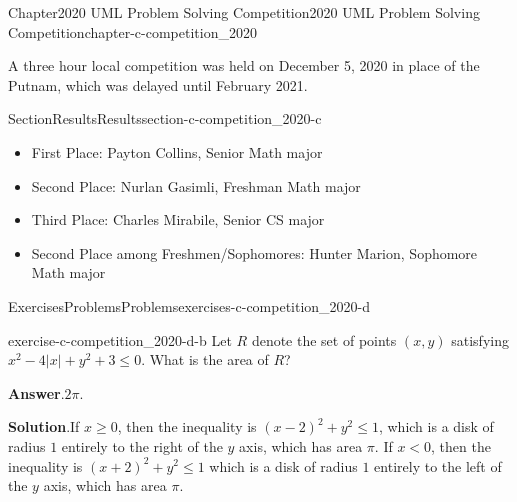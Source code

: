 \documentclass[oneside,10pt,]{book}
\newcommand{\blocktitlefont}{\relax}
\numberwithin{equation}{section}
\newcommand{\lt}{<}
\begin{document}
%
%
\typeout{************************************************}
\typeout{************************************************}
%
\begin{chapterptx}{Chapter}{2020 UML Problem Solving Competition}{}{2020 UML Problem Solving Competition}{}{}{chapter-c-competition_2020}
\renewcommand*{\chaptername}{Chapter}
\begin{introduction}{}%
A three hour local competition was held on December 5, 2020 in place of the Putnam, which was delayed until February 2021.%
\end{introduction}%
%
%
\typeout{************************************************}
\typeout{************************************************}
%
\begin{sectionptx}{Section}{Results}{}{Results}{}{}{section-c-competition_2020-c}
%
\begin{itemize}[label=\textbullet]
\item{}First Place:  Payton Collins, Senior Math major%
\item{}Second Place: Nurlan Gasimli, Freshman Math major%
\item{}Third Place: Charles Mirabile, Senior CS major%
\item{}Second Place among Freshmen\slash{}Sophomores:  Hunter Marion, Sophomore Math major%
\end{itemize}
%
\end{sectionptx}
%
%
\typeout{************************************************}
\typeout{************************************************}
%
\begin{exercises-section}{Exercises}{Problems}{}{Problems}{}{}{exercises-c-competition_2020-d}
\begin{divisionexercise}{1}{}{}{exercise-c-competition_2020-d-b}%
Let \(R\) denote the set of points \((x, y)\) satisfying \(x^2 - 4 \lvert x \rvert +y^2 + 3 \leq 0\). What is the area of \(R\)?%
\par\smallskip%
\noindent\textbf{\blocktitlefont Answer}.\hypertarget{answer-c-competition_2020-d-b-b}{}\quad{}\(2\pi\).%
\par\smallskip%
\noindent\textbf{\blocktitlefont Solution}.\hypertarget{solution-c-competition_2020-d-b-c}{}\quad{}If \(x \geq 0\), then the inequality is \((x-2)^2 +y^2 \le 1\), which is a disk of radius \(1\) entirely to the right of the \(y\) axis, which has area \(\pi\).  If \(x \lt 0\), then the inequality is \((x+2)^2 +y^2 \le 1\) which is a disk of radius \(1\) entirely to the left of the \(y\) axis, which has area \(\pi\).%

\end{divisionexercise}
\end{exercises-section}
\end{chapterptx}
\end{document}

